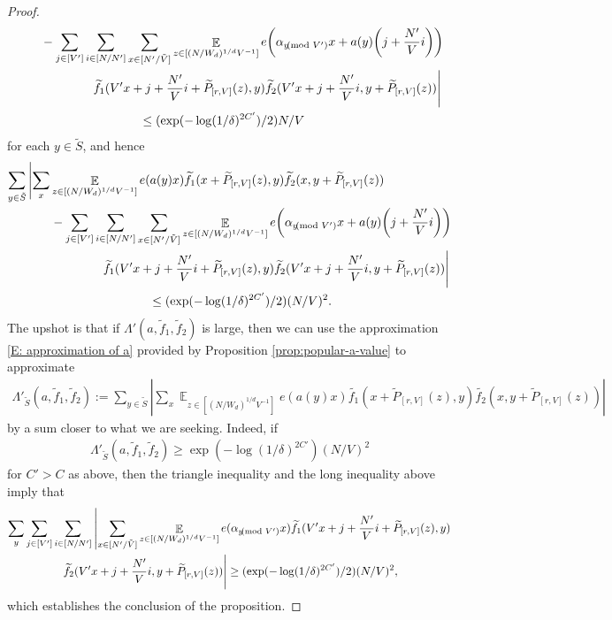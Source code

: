 \documentclass[11pt]{amsart}
\theoremstyle{definition}
\DeclareMathOperator*{\E}{\mathbb{E}}
\newcommand{\abs}[1]{\mathopen{}\left| #1\mathclose{}\right|}
\newcommand{\brac}[1]{\mathopen{}\left( #1 \mathclose{}\right)}
\begin{document}
\begin{proof}
\begin{align*}
     &\qquad- \sum_{j\in[V']}\sum_{i\in [N/N']}\sum_{x\in [N'/\tilde{V}]} \E_{z \in [(N/W_d)^{1/d}V^{-1}]} e\brac{\alpha_{y\!\!\!\!\pmod{V'}} x + a(y)\brac{j+\frac{N'}{V}i}}\\ 
     &\qquad\qquad\qquad\left. \widetilde{f_1}(V'x + j + \frac{N'}{V}i+\widetilde P_{[r, V]}(z),y)\widetilde{f_2}(V'x + j + \frac{N'}{V}i,y+\widetilde P_{[r, V]}(z))\vphantom{\sum_x} \right|\\
     &\qquad\qquad\qquad\qquad\qquad\leq (\exp(-\log(1/\delta)^{2C'})/2) N/V
\end{align*}
for each $y\in\tilde{S}$, 
and hence
\begin{align*}
    \sum_{y\in \tilde{S}}&\left|\sum_{x} \E_{z \in [(N/W_d)^{1/d}V^{-1}]} e(a(y)x)\widetilde{f_1}(x+\widetilde P_{[r, V]}(z),y)\widetilde{f_2}(x,y+\widetilde P_{[r, V]}(z))\right.\\
     &\qquad- \sum_{j\in[V']}\sum_{i\in [N/N']}\sum_{x\in [N'/\tilde{V}]} \E_{z \in [(N/W_d)^{1/d}V^{-1}]} e\brac{\alpha_{y\!\!\!\!\pmod{V'}} x + a(y)\brac{j+\frac{N'}{V}i}}\\ 
     &\qquad\qquad\qquad\left. \widetilde{f_1}(V'x + j + \frac{N'}{V}i+\widetilde P_{[r, V]}(z),y)\widetilde{f_2}(V'x + j + \frac{N'}{V}i,y+\widetilde P_{[r, V]}(z))\vphantom{\sum_x} \right|\\
     &\qquad\qquad\qquad\qquad\qquad\leq (\exp(-\log(1/\delta)^{2C'})/2)(N/V)^2.
\end{align*}
The upshot is that if $\Lambda'(a, \widetilde f_1, \widetilde f_2)$ is large, then we can use the approximation \eqref{E: approximation of a} provided by Proposition \ref{prop:popular-a-value} to approximate
\begin{align*}
    \Lambda'_{\tilde{S}}(a, \widetilde f_1, \widetilde f_2):=\sum_{y\in \tilde{S}}\abs{\sum_{x} \E_{z \in [(N/W_d)^{1/d}V^{-1}]} e(a(y)x)\widetilde{f_1}(x+\widetilde P_{[r, V]}(z),y)\widetilde{f_2}(x,y+\widetilde P_{[r, V]}(z))}
\end{align*}
by a sum closer to what we are seeking. Indeed, if 
\begin{align}\label{E: large Lambda'_S}
    \Lambda'_{\tilde{S}}(a, \widetilde f_1, \widetilde f_2)\geq \exp(-\log(1/\delta)^{2C'})(N/V)^2
\end{align}
for $C'>C$ as above, then the triangle inequality and the long inequality above imply that
\begin{multline*}
    \sum_{y}\sum_{j\in[V']}\sum_{i\in [N/N']}\left|\sum_{x\in [N'/\tilde{V}]} \E_{z \in [(N/W_d)^{1/d}V^{-1}]} e(\alpha_{y\!\!\!\!\pmod{V'}} x)\widetilde{f_1}(V'x + j + \frac{N'}{V}i+\widetilde P_{[r, V]}(z),y)\right.\\
    \left.\widetilde{f_2}(V'x + j + \frac{N'}{V}i,y+\widetilde P_{[r, V]}(z))\vphantom{\sum_x} \right|\geq (\exp(-\log(1/\delta)^{2C'})/2)(N/V)^2,
\end{multline*}
which establishes the conclusion of the proposition.


\end{proof}
\end{document}
